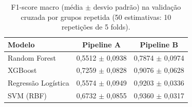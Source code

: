 \begin{table}[htbp]
  \centering
  \caption{F1-score macro (média $\pm$ desvio padrão) na validação cruzada por grupos repetida (50 estimativas: 10 repetições de 5 folds).}
  \label{tab:cv}
  \begin{tabular}{lcc}
    \toprule
    Modelo & Pipeline A & Pipeline B \\
    \midrule
    Random Forest & 0,5512 $\pm$ 0,0938 & 0,7874 $\pm$ 0,0974 \\
    XGBoost & 0,7259 $\pm$ 0,0828 & 0,9076 $\pm$ 0,0628 \\
    Regressão Logística & 0,5574 $\pm$ 0,0949 & 0,9203 $\pm$ 0,0336 \\
    SVM (RBF) & 0,6732 $\pm$ 0,0855 & 0,9360 $\pm$ 0,0317 \\
    \bottomrule
  \end{tabular}
\end{table}
